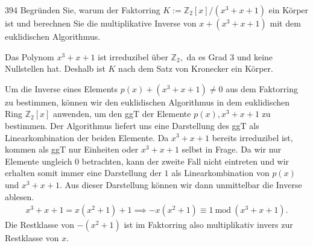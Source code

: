 \begin{algebraUE}{394}
  Begründen Sie, warum der Faktorring $K := \mathbb{Z}_2[x]/(x^3 + x + 1)$ ein Körper ist und
   berechnen Sie die multiplikative Inverse von $x + (x^3 + x + 1)$ mit dem euklidischen Algorithmus.

\end{algebraUE}

\begin{solution}
  Das Polynom $x^3 + x + 1$ ist irreduzibel über $\mathbb{Z}_2,$ da es Grad 3 und keine Nullstellen hat. Deshalb ist $K$ nach dem Satz von Kronecker ein Körper.

  Um die Inverse eines Elements $p(x) + (x^3 + x + 1) \neq 0$ aus dem Faktorring zu bestimmen,
  können wir den euklidischen Algorithmus in dem euklidischen Ring $\mathbb{Z}_2[x]$
  anwenden, um den ggT der Elemente $p(x), x^3 + x + 1$ zu bestimmen. Der Algorithmus
  liefert uns eine Darstellung des ggT als Linearkombination der beiden Elemente.
  Da $x^3 + x + 1$ bereits irreduzibel ist, kommen als ggT nur Einheiten oder
  $x^3 + x + 1$ selbst in Frage. Da wir nur Elemente ungleich $0$ betrachten, kann
  der zweite Fall nicht eintreten und wir erhalten somit immer eine Darstellung
  der $1$ als Linearkombination von $p(x)$ und $x^3 + x + 1$. Aus dieser Darstellung
  können wir dann unmittelbar die Inverse ablesen.
  \begin{align*}
    x^3 + x + 1 = x(x^2 + 1) + 1 \implies -x(x^2 + 1) \equiv 1 \mathrm{~mod~} (x^3 + x + 1).
  \end{align*}
Die Restklasse von $-(x^2+1)$ ist im Faktorring also multiplikativ invers zur Restklasse von $x$.
\end{solution}
